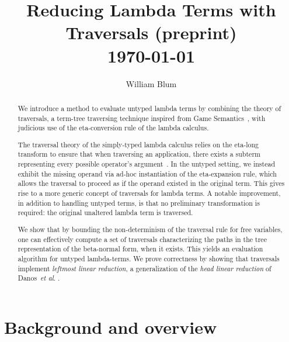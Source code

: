 \documentclass{elsarticle}
\author{William Blum}
\title{Reducing Lambda Terms with Traversals (preprint)
\\ \vspace*{1em}
\today}
\theoremstyle{plain}
\theoremstyle{definition}
\theoremstyle{remark}
\newcommand{\etal}{\textit{et al}. }
\begin{document}
\begin{abstract}
    We introduce a method to evaluate untyped lambda terms by combining the theory of traversals, a term-tree traversing technique inspired from Game Semantics~\cite{Ong2006,BlumPhd}, with judicious use of the eta-conversion rule of the lambda calculus.

    The traversal theory of the simply-typed lambda calculus relies on the eta-long transform to ensure that when traversing an application, there exists a subterm representing every possible operator's argument~\cite{BlumPhd, Ong2006}. In the untyped setting, we instead exhibit the missing operand via ad-hoc instantiation of the eta-expansion rule, which allows the traversal to proceed as if the operand existed in the original term. This gives rise to a more generic concept of traversals for lambda terms. A notable improvement, in addition to handling untyped terms, is that no preliminary transformation is required: the original unaltered lambda term is traversed.


    We show that by bounding the non-determinism of the traversal rule for free variables, one can effectively compute a set of traversals characterizing the paths in the tree representation of the beta-normal form, when it exists. This yields an evaluation algorithm for untyped lambda-terms. We prove correctness by showing that traversals implement \emph{leftmost linear reduction}, a generalization of the \emph{head linear reduction} of Danos~\etal \cite{danos-head,danosherbelinregnier1996}.
\end{abstract}

\maketitle

\tableofcontents

\section{Background and overview}
\end{document}
